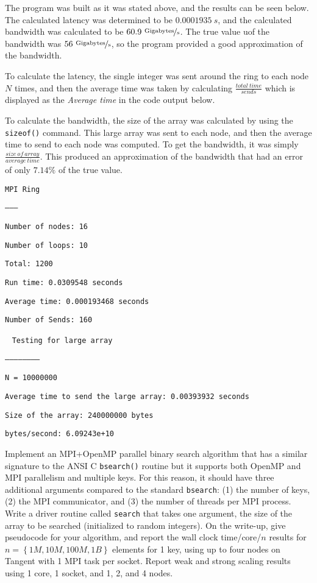 \documentclass[addpoints]{exam}
\begin{document}
\begin{questions}
\begin{solution}
The program was built as it was stated above, and the results can be seen below. The calculated latency was determined to be $0.0001935\ s$, and the calculated bandwidth was calculated to be $60.9\ \unitfrac{Gigabytes}{s}$. The true value uof the bandwidth was $56\ \unitfrac{Gigabytes}{s}$, so the program provided a good approximation of the bandwidth. 

To calculate the latency, the single integer was sent around the ring to each node $N$ times, and then the average time was taken by calculating $\frac{total\ time}{sends}$ which is displayed as the {\em Average time} in the code output below.

To calculate the bandwidth, the size of the array was calculated by using the {\tt sizeof()} command. This large array was sent to each node, and then the average time to send to each node was computed. To get the bandwidth, it was simply $\frac{size\ of\ array}{average\ time}$. This produced an approximation of the bandwidth that had an error of only $7.14\%$ of the true value.

{\tt MPI Ring}

{\tt --------}

{\tt Number of nodes: 16}

{\tt Number of loops: 10}

{\tt Total: 1200}

{\tt Run time: 0.0309548 seconds}

{\tt Average time: 0.000193468 seconds}

{\tt Number of Sends: 160}

\ \newline
{\tt Testing for large array}

{\tt -----------------------}

{\tt N = 10000000}

{\tt Average time to send the large array: 0.00393932 seconds}

{\tt Size of the array: 240000000 bytes}

{\tt bytes/second: 6.09243e+10}
\end{solution}


Implement an MPI+OpenMP parallel binary search algorithm that has a similar signature to the ANSI C \verb~bsearch()~ routine but it supports both OpenMP and MPI parallelism and multiple keys. For this reason, it should have three additional arguments compared to the standard \verb~bsearch~: (1) the number of keys, (2) the MPI communicator, and (3) the number of threads per MPI process. Write a driver routine called \verb~search~ that takes one argument, the size of the array to be searched (initialized to random integers). On the write-up, give pseudocode for your algorithm, and report the wall clock time/core/$n$ results for $n = \left\{ 1M, 10M, 100M, 1B\right\}$ elements for 1 key, using up to four nodes on Tangent with 1 MPI task per socket. Report weak and strong scaling results using 1 core, 1 socket, and 1, 2, and 4 nodes.


\end{questions}
\end{document}
